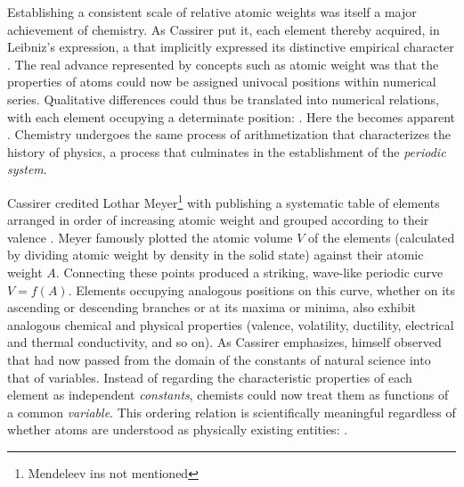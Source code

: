 \documentclass[submitted,12pt]{article}
\begin{document}
Establishing a consistent scale of relative atomic weights was itself a major achievement of chemistry. As Cassirer put it, each element thereby acquired, in Leibniz’s expression, a  that implicitly expressed its distinctive empirical character . The real advance represented by concepts such as atomic weight was that the properties of atoms could now be assigned univocal positions within numerical series. Qualitative differences could thus be translated into numerical relations, with each element occupying a determinate position:  . Here the   becomes apparent . Chemistry undergoes the same process of arithmetization that characterizes the history of physics, a process that culminates in the establishment of the \emph{periodic system}.


Cassirer credited Lothar Meyer\footnote{Mendeleev ins not mentioned} with publishing a systematic table of elements arranged in order of increasing atomic weight and grouped according to their valence \citep[see][e.g.]{Arnesano2025}. Meyer famously plotted the atomic volume $V$ of the elements (calculated by dividing atomic weight by density in the solid state) against their atomic weight $A$. Connecting these points produced a striking, wave-like periodic curve $V=f(A)$. Elements occupying analogous positions on this curve, whether on its ascending or descending branches or at its maxima or minima, also exhibit analogous chemical and physical properties (valence, volatility, ductility, electrical and thermal conductivity, and so on). As Cassirer emphasizes, \citet[176]{Meyer1884} himself observed that  had now passed from the domain of the constants of natural science into that of variables. Instead of regarding the characteristic properties of each element as independent \emph{constants}, chemists could now treat them as functions of a common \emph{variable}. This ordering relation is scientifically meaningful regardless of whether atoms are understood as physically existing entities:  .
\end{document}
